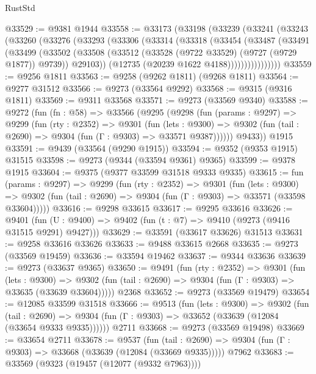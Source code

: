 \begin{lexlean}{RustStd}
\begin{coremodule}
@33529 := @9381 @1944
@33558 := @33173
    (@33198
      (@33239
        (@33241
          (@33243
            (@33260
              (@33276
                (@33293
                  (@33306
                    (@33314
                      (@33318
                        (@33454
                          (@33487
                            (@33491
                              (@33499
                                (@33502
                                  (@33508
                                    (@33512 (@33528 (@9722 @33529) (@9727 (@9729 @1877)) @9739))
                                    @29103))
                                (@12735 (@20239 @1622 @4188))))))))))))))))
@33559 := @9256 @1811
@33563 := @9258 (@9262 @1811) (@9268 @1811)
@33564 := @9277 @31512
@33566 := @9273 (@33564 @9292)
@33568 := @9315 (@9316 @1811)
@33569 := @9311 @33568
@33571 := @9273 (@33569 @9340)
@33588 := @9272
    (fun (fn : @58) =>
    @33566
      (@9295
        (@9298
          (fun (params : @9297) =>
          @9299
            (fun (rty : @2352) =>
            @9301
              (fun (lets : @9300) =>
              @9302 (fun (tail : @2690) => @9304 (fun (Γ : @9303) => @33571 @9387))))))
        @9433))
    @1915
@33591 := @9439 (@33564 (@9290 @1915))
@33594 := @9352 (@9353 @1915) @31515
@33598 := @9273 (@9344 (@33594 @9361) @9365)
@33599 := @9378 @1915
@33604 := @9375 (@9377 @33599 @31518 @9333 @9335)
@33615 := fun (params : @9297) =>
  @9299
    (fun (rty : @2352) =>
    @9301
      (fun (lets : @9300) =>
      @9302 (fun (tail : @2690) => @9304 (fun (Γ : @9303) => @33571 (@33598 @33604)))))
@33616 := @9298 @33615
@33617 := @9295 @33616
@33626 := @9401
    (fun (U : @9400) => @9402 (fun (t : @7) => @9410 (@9273 (@9416 @31515 @9291) @9427)))
@33629 := @33591 (@33617 @33626) @31513
@33631 := @9258 @33616 @33626
@33633 := @9488 @33615 @2668
@33635 := @9273 (@33569 @19459)
@33636 := @33594 @19462
@33637 := @9344 @33636
@33639 := @9273 (@33637 @9365)
@33650 := @9491
    (fun (rty : @2352) =>
    @9301
      (fun (lets : @9300) =>
      @9302 (fun (tail : @2690) => @9304 (fun (Γ : @9303) => @33635 (@33639 @33604)))))
    @2368
@33652 := @9273 (@33569 @19479)
@33654 := @12085 @33599 @31518
@33666 := @9513
    (fun (lets : @9300) =>
    @9302
      (fun (tail : @2690) =>
      @9304 (fun (Γ : @9303) => @33652 (@33639 (@12084 (@33654 @9333 @9335))))))
    @2711
@33668 := @9273 (@33569 @19498)
@33669 := @33654 @2711
@33678 := @9537
    (fun (tail : @2690) => @9304 (fun (Γ : @9303) => @33668 (@33639 (@12084 (@33669 @9335)))))
    @7962
@33683 := @33569 (@9323 (@19457 (@12077 (@9332 @7963))))

\end{coremodule}
\end{lexlean}
